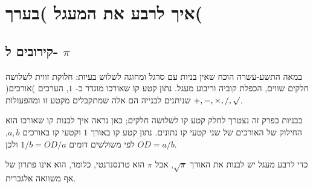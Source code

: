 
\chapter{%
איך לרבע את המעגל )בערך(}

\section{
קירובים ל-%
$\pi$}\label{s.square-intro}

במאה התשע-עשרה הוכח שאין בניות עם סרגל ומחוגה לשלוש בעיות: חלוקת זווית לשלושה חלקים שווים, הכפלת קוביה וריבוע מעגל. נתון קטע קו שאורכו מוגדר כ-%
$1$,
הערכים )אורכים( שניתנים לבנייה הם אלה שמתקבלים מקטע זו ומהפעולות 
$+,-,\times,/,\surd$.

בבניות בפרק זה נצטרך לחלק קטע קו לשלושה חלקים; כאן נראה איך לבנות קו שאורכו הוא החילוק של האורכים של שני קטעי קו נתונים. נתון קטע קו באורך 
$1$
וקטעי קו באורכים 
$a,b$,
לפי משולשים דומים
$1/b=\overline{OD}/a$
ולכן
$\overline{OD}=a/b$.

\begin{center}
\end{center}

כדי לרבע מעגל יש לבנות את האורך 
$\sqrt{\pi}$,
אבל
$\pi$
הוא טרנסנדנטי, כלומר, הוא אינו פתרון של אף משוואה אלגברית.

